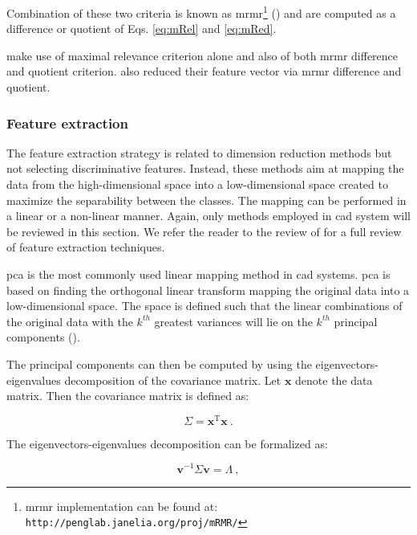 Combination of these two criteria is known as \ac{mrmr}\footnote{\ac{mrmr} implementation can be found at: \texttt{http://penglab.janelia.\allowbreak org/proj/mRMR/}} (\cite{Peng2005}) and are computed as a difference or quotient of Eqs. \eqref{eq:mRel} and \eqref{eq:mRed}.

\cite{Niaf2011,Niaf2012} make use of maximal relevance criterion alone and also of both \ac{mrmr} difference and quotient criterion. \cite{Viswanath2012} also reduced their feature vector via \ac{mrmr} difference and quotient.

\subsubsection{Feature extraction}

The feature extraction strategy is related to dimension reduction methods but not selecting discriminative features. Instead, these methods aim at mapping the data from the high-dimensional space into a low-dimensional space created to maximize the separability between the classes. The mapping can be performed in a linear or a non-linear manner. Again, only methods employed in \ac{cad} system will be reviewed in this section. We refer the reader to the review of \cite{Fodor2002} for a full review of feature extraction techniques.

\ac{pca} is the most commonly used linear mapping method in \ac{cad} systems. \ac{pca} is based on finding the orthogonal linear transform mapping the original data into a low-dimensional space. The space is defined such that the linear combinations of the original data with the $k^{th}$ greatest variances will lie on the $k^{th}$ principal components (\cite{Jolliffe2002}).

The principal components can then be computed by using the eigenvectors-eigenvalues decomposition of the covariance matrix. Let $\mathbf{x}$ denote the data matrix. Then the covariance matrix is defined as:

\begin{equation}
	\Sigma = \mathbf{x}^{\text{T}} \mathbf{x} \ .
	\label{eq:covmat}
\end{equation}

The eigenvectors-eigenvalues decomposition can be formalized as:

\begin{equation}
	\mathbf{v}^{-1} \Sigma \mathbf{v} = \Lambda \ ,
	\label{eq:eigpca}
\end{equation}

